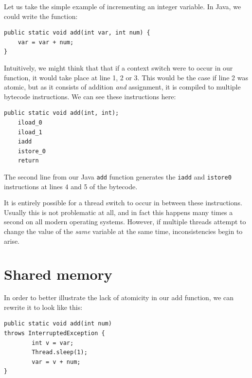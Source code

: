 \documentclass[a4paper,12pt]{kth-mag}
\begin{document}
Let us take the simple example of incrementing an integer variable. In Java, we could write the function:

\begin{listing}[H]
\begin{verbatim}
public static void add(int var, int num) { 
	var = var + num; 
}
\end{verbatim}
\end{listing}

Intuitively, we might think that that if a context switch were to occur in our function, it would take place at line 1, 2 or 3. This would be the case if line 2 was atomic, but as it consists of addition \textit{and} assignment, it is compiled to multiple bytecode instructions. We can see these instructions here:

\begin{listing}[H]
	\begin{verbatim}
public static void add(int, int);
	iload_0
	iload_1
	iadd
	istore_0
	return
  	\end{verbatim}
\end{listing}

The second line from our Java \texttt{add} function generates the \texttt{iadd} and \texttt{istore0} instructions at lines 4 and 5 of the bytecode. 

It is entirely possible for a thread switch to occur in between these instructions. Usually this is not problematic at all, and in fact this happens many times a second on all modern operating systems. However, if multiple threads attempt to change the value of the \textit{same} variable at the same time, inconsistencies begin to arise. 

\section{Shared memory}

In order to better illustrate the lack of atomicity in our add function, we can rewrite it to look like this:

\begin{listing}[H]
	\begin{verbatim}
public static void add(int num) 
throws InterruptedException {
        int v = var;
        Thread.sleep(1);
        var = v + num;
}
  	\end{verbatim}
\end{listing}
\end{document}
